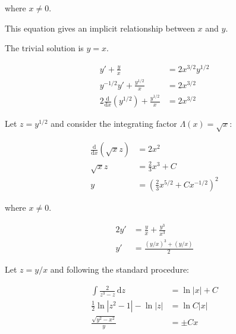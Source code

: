 \documentclass[12pt]{article}
\begin{document}
where $x \ne 0$.

This equation gives an implicit relationship between $x$ and $y$.

The trivial solution is $y = x$.


\begin{equation}
    \begin{split}
        y' + \frac{y}{x} &= 2 x^{3/2} y^{1/2} \\
        y^{-1/2} y' + \frac{y^{1/2}}{x} &= 2 x^{3/2} \\
        2 \frac{\mathrm{d}}{\mathrm{d}x} \left( y^{1/2} \right) + \frac{y^{1/2}}{x} &= 2 x^{3/2}
    \end{split}
\end{equation}

Let $z = y^{1/2}$ and consider the integrating factor $\Lambda(x) = \sqrt{x}$:

\begin{equation}
    \begin{split}
        \frac{\mathrm{d}}{\mathrm{d}x} \left( \sqrt{x} z \right) &= 2x^{2} \\
        \sqrt{x} z &= \frac{2}{3} x^{3} + C \\
        y &= \left( \frac{2}{3} x^{5/2} + Cx^{-1/2} \right)^{2}
    \end{split}
\end{equation}

where $x \ne 0$.


\begin{equation}
    \begin{split}
        2y' &= \frac{y}{x} + \frac{y^{3}}{x^{3}} \\
        y' &= \frac{(y/x)^{3} + (y/x)}{2}
    \end{split}
\end{equation}

Let $z = y/x$ and following the standard procedure:

\begin{equation}
    \begin{split}
        \int \frac{2}{z^{3} - z} \, \mathrm{d}z &= \ln{\left\lvert x \right\rvert} + C \\
        \frac{1}{2} \ln{\left\lvert z^{2} - 1 \right\rvert} - \ln{\left\lvert z \right\rvert} &= \ln{C \left\lvert x \right\rvert} \\
        \frac{\sqrt{y^{2} - x^{2}}}{y} &= \pm Cx
    \end{split}
\end{equation}
\end{document}
